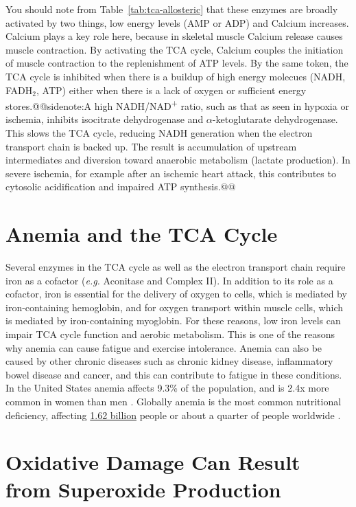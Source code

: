 \documentclass{tufte-handout}
\makeatletter
\def\sidenote#1{@@sidenote:#1@@}
\makeatother
\begin{document}
You should note from Table~\ref{tab:tca-allosteric} that these enzymes are broadly activated by two things, low energy levels (AMP or ADP) and Calcium increases.  Calcium plays a key role here, because in skeletal muscle Calcium release causes muscle contraction.  By activating the TCA cycle, Calcium couples the initiation of muscle contraction to the replenishment of ATP levels.  By the same token, the TCA cycle is inhibited when there is a buildup of high energy molecues (NADH, FADH$_2$, ATP) either when there is a lack of oxygen or sufficient energy stores.\sidenote{A high NADH/NAD\textsuperscript{+} ratio, such as that as seen in hypoxia or ischemia, inhibits isocitrate dehydrogenase and $\alpha$-ketoglutarate dehydrogenase. This slows the TCA cycle, reducing NADH generation when the electron transport chain is backed up. The result is accumulation of upstream intermediates and diversion toward anaerobic metabolism (lactate production). In severe ischemia, for example after an ischemic heart attack, this contributes to cytosolic acidification and impaired ATP synthesis.}

\section{Anemia and the TCA Cycle}

Several enzymes in the TCA cycle as well as the electron transport chain require iron as a cofactor (\textit{e.g.} Aconitase and Complex II).  In addition to its role as a cofactor, iron is essential for the delivery of oxygen to cells, which is mediated by iron-containing hemoglobin, and for oxygen transport within muscle cells, which is mediated by iron-containing myoglobin.  For these reasons, low iron levels can impair TCA cycle function and aerobic metabolism.  This is one of the reasons why anemia can cause fatigue and exercise intolerance.  Anemia can also be caused by other chronic diseases such as chronic kidney disease, inflammatory bowel disease and cancer, and this can contribute to fatigue in these conditions.  In the United States anemia affects 9.3\% of the population, and is 2.4x more common in women than men \citep{williams2024anemia}.  Globally anemia is the most common nutritional deficiency, affecting \underline{1.62 billion} people or about a quarter of people worldwide \citep{who2025anaemia}.

\section{Oxidative Damage Can Result from Superoxide Production}
\end{document}
